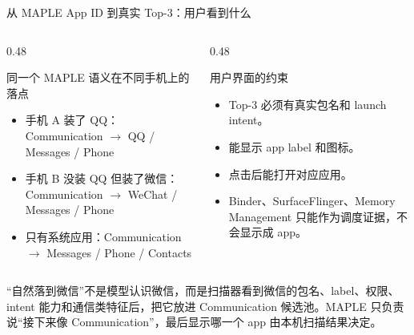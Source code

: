 \documentclass[UTF8,aspectratio=169,10pt]{ctexbeamer}
\newcommand{\explainfoot}[1]{%
  \vspace{0.35em}
  {\scriptsize\color{memoGray}#1}
}
\begin{document}
\begin{frame}{从 MAPLE App ID 到真实 Top-3：用户看到什么}
  \begin{columns}[T,totalwidth=\textwidth]
    \begin{column}{0.48\textwidth}
      \begin{block}{同一个 MAPLE 语义在不同手机上的落点}
        \begin{itemize}
          \item 手机 A 装了 QQ：Communication \(\rightarrow\) QQ / Messages / Phone
          \item 手机 B 没装 QQ 但装了微信：Communication \(\rightarrow\) WeChat / Messages / Phone
          \item 只有系统应用：Communication \(\rightarrow\) Messages / Phone / Contacts
        \end{itemize}
      \end{block}
    \end{column}
    \begin{column}{0.48\textwidth}
      \begin{block}{用户界面的约束}
        \begin{itemize}
          \item Top-3 必须有真实包名和 launch intent。
          \item 能显示 app label 和图标。
          \item 点击后能打开对应应用。
          \item Binder、SurfaceFlinger、Memory Management 只能作为调度证据，不会显示成 app。
        \end{itemize}
      \end{block}
    \end{column}
  \end{columns}
  \explainfoot{“自然落到微信”不是模型认识微信，而是扫描器看到微信的包名、label、权限、intent 能力和通信类特征后，把它放进 Communication 候选池。MAPLE 只负责说“接下来像 Communication”，最后显示哪一个 app 由本机扫描结果决定。}
\end{frame}
\end{document}
